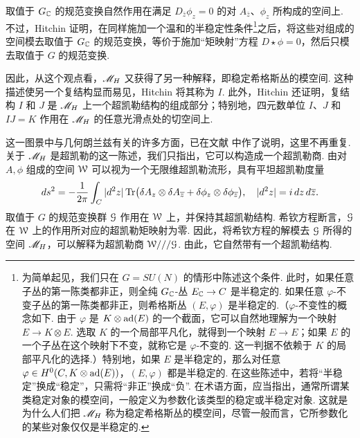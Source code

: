 取值于 $G_{\mathbb C}$ 的规范变换自然作用在满足 $D_{\bar z}\phi_z=0$ 的对 $A_{\bar z}$、$\phi_z$ 所构成的空间上. 不过，Hitchin 证明，在同样施加一个温和的半稳定性条件\footnote{\label{semicon}为简单起见，我们只在 $G=SU(N)$ 的情形中陈述这个条件. 此时，如果任意子丛的第一陈类都非正，则全纯 $G_{\mathbb C}$-丛 $E_{\mathbb C}\to C$ 是半稳定的. 如果任意 $\varphi$-不变子丛的第一陈类都非正，则希格斯丛 $(E,\varphi)$ 是半稳定的.（$\varphi$-不变性的概念如下. 由于 $\varphi$ 是 $K\otimes {\mathrm{ad}(E)}$ 的一个截面，它可以自然地理解为一个映射 $E\to K\otimes E$. 选取 $K$ 的一个局部平凡化，就得到一个映射 $E\to E$；如果 $E$ 的一个子丛在这个映射下不变，就称它是 $\varphi$-不变的. 这一判据不依赖于 $K$ 的局部平凡化的选择.）特别地，如果 $E$ 是半稳定的，那么对任意 $\varphi\in H^0(C,K\otimes{\mathrm{ad}(E)})$，$(E,\varphi)$ 都是半稳定的. 在这些陈述中，若将“半稳定”换成“稳定”，只需将“非正”换成“负”. 在术语方面，应当指出，通常所谓某类稳定对象的模空间，一般定义为参数化该类型的稳定或半稳定对象. 这就是为什么人们把 ${{\mathscr{M}}_H}$ 称为稳定希格斯丛的模空间，尽管一般而言，它所参数化的某些对象仅仅是半稳定的.}之后，将这些对组成的空间模去取值于 $G_{\mathbb C}$ 的规范变换，等价于施加“矩映射”方程 $D\star\phi=0$，然后只模去取值于 $G$ 的规范变换.

因此，从这个观点看，${{\mathscr{M}}_H}$ 又获得了另一种解释，即稳定希格斯丛的模空间. 这种描述使另一个复结构显而易见，Hitchin 将其称为 $I$. 此外，Hitchin 还证明，复结构 $I$ 和 $J$ 是 ${{\mathscr{M}}_H}$ 上一个超凯勒结构的组成部分；特别地，四元数单位 $I$、$J$ 和 $IJ=K$ 作用在 ${{\mathscr{M}}_H}$ 的任意光滑点处的切空间上.

这一图景中与几何朗兰兹有关的许多方面，已在文献 \cite{KW} 中作了说明，这里不再重复. 关于 ${{\mathscr{M}}_H}$ 是超凯勒的这一陈述，我们只指出，它可以构造成一个超凯勒商. 由对 $A,\phi$ 组成的空间 ${\mathcal W}$ 可以视为一个无限维超凯勒流形，具有平坦超凯勒度量
\begin{equation}
\label{igob}
ds^2=-{1\over
2\pi}\int_C|d^2z|\,{\rm Tr}\bigl(\delta A_z\otimes \delta A_{\overline
z}+\delta \phi_z\otimes
\delta \phi_{\overline z}\bigr),~~~|d^2z|=i\,dz\,d\overline z.
\end{equation}
取值于 $G$ 的规范变换群 ${\mathcal G}$ 作用在 ${\mathcal W}$ 上，并保持其超凯勒结构. 希钦方程断言，${\mathcal G}$ 在 ${\mathcal W}$ 上的作用所对应的超凯勒矩映射为零. 因此，将希钦方程的解模去 ${\mathcal G}$ 所得的空间 ${{\mathscr{M}}_H}$，可以解释为超凯勒商 ${\mathcal W}///{\mathcal G}$. 由此，它自然带有一个超凯勒结构.

